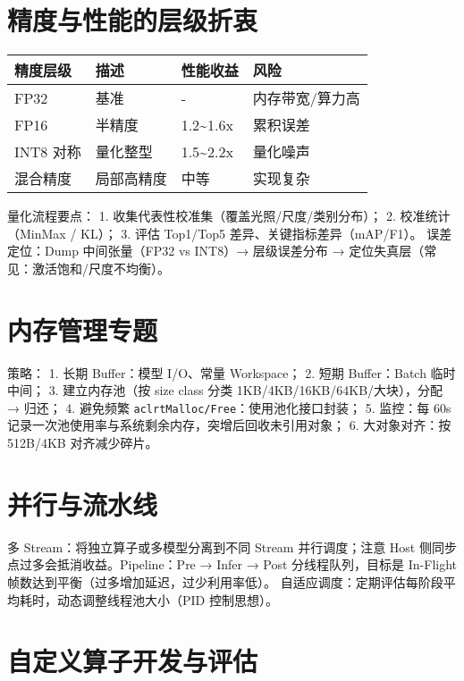 \section{精度与性能的层级折衷}\label{ux7cbeux5ea6ux4e0eux6027ux80fdux7684ux5c42ux7ea7ux6298ux8877}

\begin{longtable}[]{@{}llll@{}}
\toprule\noalign{}
精度层级 & 描述 & 性能收益 & 风险 \\
\midrule\noalign{}
\endhead
\bottomrule\noalign{}
\endlastfoot
FP32 & 基准 & - & 内存带宽/算力高 \\
FP16 & 半精度 & 1.2\textasciitilde1.6x & 累积误差 \\
INT8 对称 & 量化整型 & 1.5\textasciitilde2.2x & 量化噪声 \\
混合精度 & 局部高精度 & 中等 & 实现复杂 \\
\end{longtable}

量化流程要点： 1. 收集代表性校准集（覆盖光照/尺度/类别分布）； 2.
校准统计（MinMax / KL）； 3. 评估 Top1/Top5
差异、关键指标差异（mAP/F1）。 误差定位：Dump 中间张量（FP32 vs INT8）→
层级误差分布 → 定位失真层（常见：激活饱和/尺度不均衡）。

\section{内存管理专题}\label{ux5185ux5b58ux7ba1ux7406ux4e13ux9898}

策略： 1. 长期 Buffer：模型 I/O、常量 Workspace； 2. 短期 Buffer：Batch
临时中间； 3. 建立内存池（按 size class 分类
1KB/4KB/16KB/64KB/大块），分配 → 归还； 4. 避免频繁
\passthrough{\lstinline!aclrtMalloc/Free!}：使用池化接口封装； 5.
监控：每 60s 记录一次池使用率与系统剩余内存，突增后回收未引用对象； 6.
大对象对齐：按 512B/4KB 对齐减少碎片。

\section{并行与流水线}\label{ux5e76ux884cux4e0eux6d41ux6c34ux7ebf}

多 Stream：将独立算子或多模型分离到不同 Stream 并行调度；注意 Host
侧同步点过多会抵消收益。Pipeline：Pre → Infer → Post 分线程队列，目标是
In-Flight 帧数达到平衡（过多增加延迟，过少利用率低）。
自适应调度：定期评估每阶段平均耗时，动态调整线程池大小（PID 控制思想）。

\section{自定义算子开发与评估}\label{ux81eaux5b9aux4e49ux7b97ux5b50ux5f00ux53d1ux4e0eux8bc4ux4f30}

